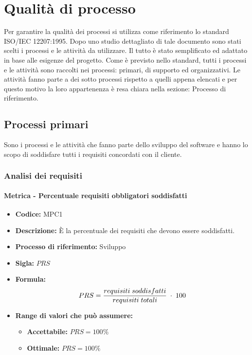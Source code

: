 \section{Qualità di processo}
Per garantire la qualità dei processi si utilizza come riferimento lo standard ISO/IEC 12207:1995. Dopo uno studio dettagliato di tale documento sono stati scelti i processi
e le attività da utilizzare. Il tutto è stato semplificato ed adattato in base alle esigenze del progetto. Come è previsto nello standard, tutti i processi e le attività sono raccolti 
nei processi: primari, di supporto ed organizzativi. Le attività fanno parte a dei sotto processi rispetto a quelli appena elencati e per questo motivo la loro 
appartenenza è resa chiara nella sezione: Processo di riferimento.

\subsection{Processi primari}
Sono i processi e le attività che fanno parte dello sviluppo del software e hanno lo scopo di soddisfare tutti i requisiti concordati con il cliente.

\subsubsection{Analisi dei requisiti}
    \paragraph{Metrica - Percentuale requisiti obbligatori soddisfatti}
    \begin{itemize}
        \item \textbf{Codice:} MPC1
        \item \textbf{Descrizione:} È la percentuale dei requisiti che devono essere soddisfatti.
        \item \textbf{Processo di riferimento:} Sviluppo
        \item \textbf{Sigla:} $PRS$
        \item \textbf{Formula:} $$PRS = {requisiti \; soddisfatti \over requisiti \; totali}\; \cdot \; 100$$
        \item \textbf{Range di valori che può assumere:}
        \begin{itemize}
            \item \textbf{Accettabile:} $PRS = 100\%$
            \item \textbf{Ottimale:} $PRS = 100\%$
        \end{itemize}
    \end{itemize} 
